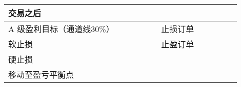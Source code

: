 \documentclass{article}
\begin{document}
\begin{table}[!ht]
\begin{tabularx}{\textwidth}{|X|l|l|X|r|X|ll|}
        \textbf{交易之后}    & ~      & ~     & ~           & ~     & ~         & ~ & ~ \\ \hline
        A 级盈利目标（通道线30\%） & ~      & ~     & ~           & 止损订单  & ~         & ~ & ~ \\ \hline
        软止损              & ~      & ~     & ~           & 止盈订单  & ~         & ~ & ~ \\ \hline
        硬止损              & ~      & ~     & ~           & ~     & ~         & ~ & ~ \\ \hline
        移动至盈亏平衡点         & ~      & ~     & ~           & ~     & ~         & ~ & ~ \\ \hline
    \end{tabularx}
\end{table}
\end{document}
